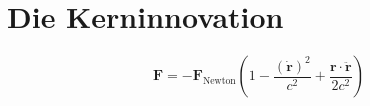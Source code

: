 \section{Die Kerninnovation}
\[
\mathbf{F} = -\mathbf{F}_\text{Newton} \left(1 - \frac{(\dot{\mathbf{r}})^2}{c^2} + \frac{\mathbf{r} \cdot \ddot{\mathbf{r}}}{2c^2}\right)
\]